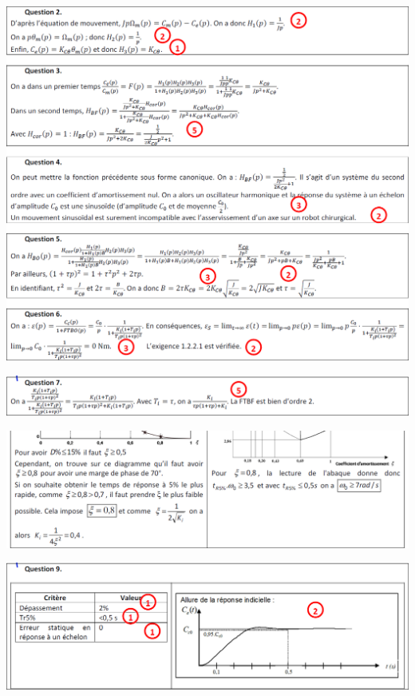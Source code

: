 \documentclass[10pt,fleqn]{article} %
\begin{document}
\newpage


\begin{center}
\includegraphics[width=\linewidth]{images/cor_01}
\end{center}

\begin{center}
\includegraphics[width=\linewidth]{images/cor_02_01}
\end{center}


\begin{center}
\includegraphics[width=\linewidth]{images/cor_02_02}
\end{center}

\begin{center}
\includegraphics[width=\linewidth]{images/cor_03}
\end{center}
\end{document}
